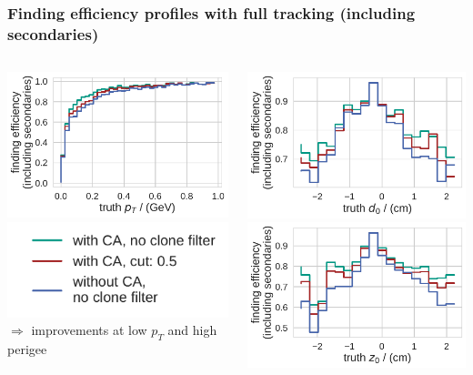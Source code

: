 \documentclass[18pt, aspectratio=169]{beamer}
\begin{document}
\begin{frame}
  \frametitle{Finding efficiency profiles with full tracking (including secondaries)}
  \begin{columns}
    \begin{column}{.5\textwidth}
      \centering
      \includegraphics[width=.7\textwidth]{figures/findeff_secondaries_by_pt_truth_fullreco.pdf}\\
      \includegraphics[width=.7\textwidth]{figures/legend_fom_profile.pdf}\\
      $\Rightarrow$ improvements at low $p_T$ and high perigee
    \end{column}    
    \begin{column}{.5\textwidth}
      \centering
      \includegraphics[width=.7\textwidth]{figures/findeff_secondaries_by_d0_truth_fullreco.pdf}\\
      \includegraphics[width=.7\textwidth]{figures/findeff_secondaries_by_z0_truth_fullreco.pdf}

\end{column}
\end{columns}
\end{frame}
\end{document}
